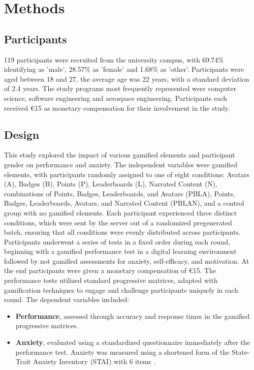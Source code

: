 \section{Methods}
\subsection{Participants}
119 participants were recruited from the university campus, with 69.74\% identifying as 'male', 28.57\% as 'female' and 1.68\% as 'other'.
Participants were aged between 18 and 27, the average age was 22 years, with a standard deviation of 2.4 years.
The study programs most frequently represented were computer science, software engineering and aerospace engineering.
Participants each received €15 as monetary compensation for their involvement in the study.

\subsection{Design}
This study explored the impact of various gamified elements and participant gender on performance and anxiety.
The independent variables were gamified elements, with participants randomly assigned to one of eight conditions: Avatars (A), Badges (B), Points (P), Leaderboards (L), Narrated Content (N), combinations of Points, Badges, Leaderboards, and Avatars (PBLA), Points, Badges, Leaderboards, Avatars, and Narrated Content (PBLAN), and a control group with no gamified elements.
Each participant experienced three distinct conditions, which were sent by the server out of a randomized pregenerated batch, ensuring that all conditions were evenly distributed across participants.
Participants underwent a series of tests in a fixed order during each round, beginning with a gamified performance test in a digital learning environment followed by  not gamified assessments for anxiety, self-efficacy, and motivation.
At the end participants were given a monetary compensation of €15.
The performance tests utilized standard progressive matrices, adapted with gamification techniques to engage and challenge participants uniquely in each round.
The dependent variables included:
\begin{itemize}
  \item \textbf{Performance}, assessed through accuracy and response times in the gamified progressive matrices.
  \item \textbf{Anxiety}, evaluated using a standardized questionnaire immediately after the performance test. Anxiety was measured using a shortened form of the State-Trait Anxiety Inventory (STAI) with 6 items \parencite{marteauDevelopmentSixitemShortform1992}.
\end{itemize}

